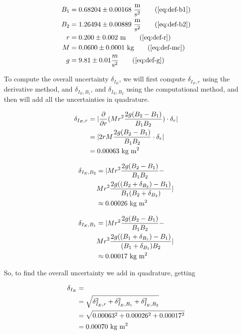 \documentclass[coverpage]{article}
\newcommand{\iUnit}{\text{kg $\text{m}^2$}}
\newcommand{\mpssq}{\frac{\text{m}}{\text{s}^2}}
\begin{document}
	\begin{align}
		B_1 &= 0.68204 \pm 0.00168\ \mpssq \tag{\ref{eq:def-b1}} \\
		B_2 &= 1.26494 \pm 0.00889\ \mpssq \tag{\ref{eq:def-b2}} \\
		r &= 0.200 \pm 0.002\ \text{m} \tag{\ref{eq:def-r}} \\
		M &= 0.0600 \pm 0.0001\ \text{kg} \tag{\ref{eq:def-mc}} \notag \\
		g &= 9.81 \pm 0.01 \frac{m}{\text{s}^2} \tag{\ref{eq:def-g}}
	\end{align}
	
	To compute the overall uncertainty $\delta_{I_E}$, we will first compute $\delta_{I_E, r}$ using the derivative method, and $\delta_{I_E, B_1}$, and $\delta_{I_E, B_2}$ using the computational method, and then will add all the uncertainties in quadrature.
	
	\begin{align}
		\delta_{I_E, r} &= |\frac{\partial}{\partial r}(M r^2 \frac{2g(B_2 - B_1)}{B_1 B_2}) \cdot \delta_r| \notag \\
		&= |2r M \frac{2g(B_2 - B_1)}{B_1 B_2} \cdot \delta_r| \notag \\
		&= 0.00063\ \iUnit
	\end{align}

	\begin{align}
		\delta_{I_E, B_2} &= |M r^2 \frac{2g(B_2 - B_1)}{B_1 B_2} - \notag \\
		&M r^2 \frac{2g((B_2 + \delta_{B_2}) - B_1)}{B_1 (B_2 + \delta_{B_2})}| \notag \\
		&\approx 0.00026\ \iUnit
	\end{align}

	\begin{align}
		\delta_{I_E, B_1} &= |M r^2 \frac{2g(B_2 - B_1)}{B_1 B_2} - \notag \\
		&M r^2 \frac{2g((B_1 + \delta_{B_1}) - B_1)}{(B_1 + \delta_{B_1}) B_2}| \notag \\
		&\approx 0.00017\ \iUnit
	\end{align}

	So, to find the overall uncertainty we add in quadrature, getting
	
	\begin{align}
		\delta_{I_E} &= \\
		&= \sqrt{\delta_{I_E, r}^2 + \delta_{I_E, B_1}^2 + \delta_{I_E, B_2}^2} \notag \\
		&= \sqrt{0.00063^2 + 0.00026^2 + 0.00017^2} \notag \\
		&= 0.00070\ \iUnit
	\end{align}
\end{document}

